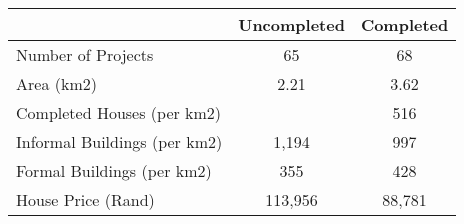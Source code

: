 \begin{tabular}{l*{1}{cc}}
 &Uncompleted &Completed  \\
\hline 
Number of Projects &         65 &         68  \\
Area (km2) &       2.21 &       3.62  \\
Completed Houses (per km2) &  &        516  \\
Informal Buildings (per km2) &      1,194 &        997  \\
Formal Buildings (per km2) &        355 &        428  \\
House Price (Rand) &    113,956 &     88,781  \\
\hline
\end{tabular}
